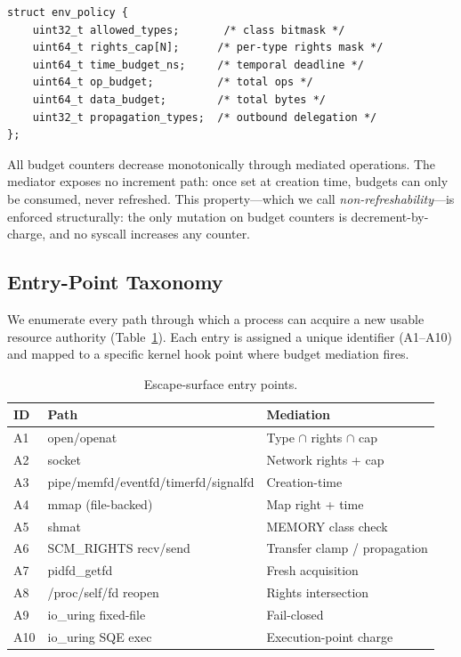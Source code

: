 \documentclass[letterpaper,twocolumn,10pt]{article}
\begin{document}
\begin{verbatim}
struct env_policy {
    uint32_t allowed_types;       /* class bitmask */
    uint64_t rights_cap[N];      /* per-type rights mask */
    uint64_t time_budget_ns;     /* temporal deadline */
    uint64_t op_budget;          /* total ops */
    uint64_t data_budget;        /* total bytes */
    uint32_t propagation_types;  /* outbound delegation */
};
\end{verbatim}

All budget counters decrease monotonically through mediated operations.
The mediator exposes no increment path: once set at creation time,
budgets can only be consumed, never refreshed.  This property---which
we call \emph{non-refreshability}---is enforced structurally: the only
mutation on budget counters is decrement-by-charge, and no syscall
increases any counter.

\subsection{Entry-Point Taxonomy}

We enumerate every path through which a process can acquire a new
usable resource authority (Table~\ref{tab:entrypoints}).  Each entry
is assigned a unique identifier (A1--A10) and mapped to a specific
kernel hook point where budget mediation fires.

\begin{table}[t]
\centering
\caption{Escape-surface entry points.}
\label{tab:entrypoints}
\small
\begin{tabular}{llp{3.2cm}}
\toprule
\textbf{ID} & \textbf{Path} & \textbf{Mediation} \\
\midrule
A1 & open/openat & Type $\cap$ rights $\cap$ cap \\
A2 & socket & Network rights + cap \\
A3 & pipe/memfd/eventfd/timerfd/signalfd & Creation-time \\
A4 & mmap (file-backed) & Map right + time \\
A5 & shmat & MEMORY class check \\
A6 & SCM\_RIGHTS recv/send & Transfer clamp / propagation \\
A7 & pidfd\_getfd & Fresh acquisition \\
A8 & /proc/self/fd reopen & Rights intersection \\
A9 & io\_uring fixed-file & Fail-closed \\
A10 & io\_uring SQE exec & Execution-point charge \\
\bottomrule
\end{tabular}
\end{table}
\end{document}
